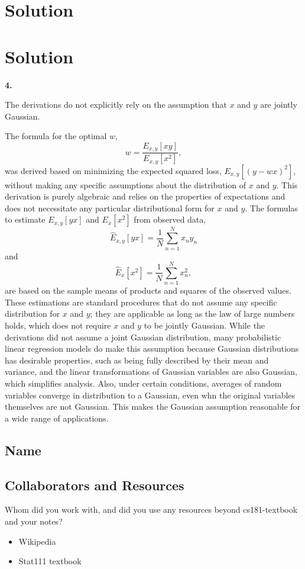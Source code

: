 \documentclass[submit]{harvardml}
\newenvironment{solution}
  {\color{blue}\section*{Solution}}
{}
\begin{document}
\begin{solution}
\begin{solution}
\bigskip
\textbf{4.}

The derivations do not explicitly rely on the assumption that \(x\) and \(y\) are jointly Gaussian.

The formula for the optimal \(w\),
   $$
   w = \frac{E_{x, y}[xy]}{E_{x, y}[x^2]},
   $$
was derived based on minimizing the expected squared loss, \(E_{x, y}[(y - wx)^2]\), without making any specific assumptions about the distribution of \(x\) and \(y\). This derivation is purely algebraic and relies on the properties of expectations and does not necessitate any particular distributional form for \(x\) and \(y\). The formulas to estimate \(E_{x, y}[yx]\) and \(E_x[x^2]\) from observed data,
   $$
   \hat{E}_{x, y}[yx] = \frac{1}{N} \sum_{n=1}^N x_n y_n
   $$
   and
   $$
   \hat{E}_x[x^2] = \frac{1}{N} \sum_{n=1}^N x_n^2,
   $$
are based on the sample means of products and squares of the observed values. These estimations are standard procedures that do not assume any specific distribution for \(x\) and \(y\); they are applicable as long as the law of large numbers holds, which does not require \(x\) and \(y\) to be jointly Gaussian.
While the derivations did not assume a joint Gaussian distribution, many probabilistic linear regression models do make this assumption because Gaussian distributions has desirable properties, such as being fully described by their mean and variance, and the linear transformations of Gaussian variables are also Gaussian, which simplifies analysis. Also, under certain conditions, averages of random variables converge in distribution to a Gaussian, even whn the original variables themselves are not Gaussian. This makes the Gaussian assumption reasonable for a wide range of applications.

\end{solution}

\newpage
\subsection*{Name}

\subsection*{Collaborators and Resources}
Whom did you work with, and did you use any resources beyond cs181-textbook and your notes?

\begin{itemize}
    \item Wikipedia
    \item Stat111 textbook
\end{itemize}
\end{document}
